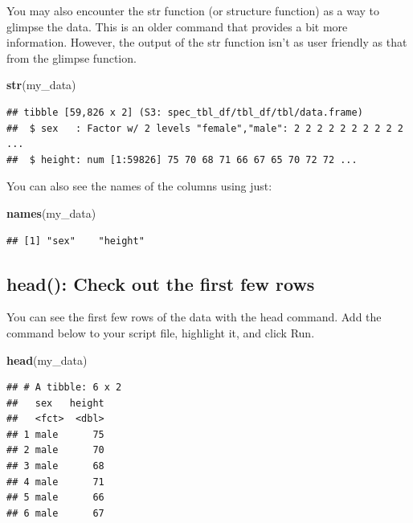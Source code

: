 \documentclass[
]{krantz}
\makeatletter
\newenvironment{Shaded}{\begin{snugshade}}{\end{snugshade}}
\newcommand{\KeywordTok}[1]{\textcolor[rgb]{0.27,0.27,0.27}{\textbf{#1}}}
\newcommand{\NormalTok}[1]{#1}
\newenvironment{kframe}{%
\medskip{}
\setlength{\fboxsep}{.8em}
 \def\at@end@of@kframe{}%
 \ifinner\ifhmode%
  \def\at@end@of@kframe{\end{minipage}}%
  \begin{minipage}{\columnwidth}%
 \fi\fi%
 \def\FrameCommand##1{\hskip\@totalleftmargin \hskip-\fboxsep
 \colorbox{shadecolor}{##1}\hskip-\fboxsep
     \hskip-\linewidth \hskip-\@totalleftmargin \hskip\columnwidth}%
 \MakeFramed {\advance\hsize-\width
   \@totalleftmargin\z@ \linewidth\hsize
   \@setminipage}}%
 {\par\unskip\endMakeFramed%
 \at@end@of@kframe}
\renewenvironment{Shaded}{\begin{kframe}}{\end{kframe}}
\makeatother
\begin{document}
You may also encounter the str function (or structure function) as a way to glimpse the data. This is an older command that provides a bit more information. However, the output of the str function isn't as user friendly as that from the glimpse function.

\begin{Shaded}
\begin{Highlighting}[]
\KeywordTok{str}\NormalTok{(my_data)}
\end{Highlighting}
\end{Shaded}

\begin{verbatim}
## tibble [59,826 x 2] (S3: spec_tbl_df/tbl_df/tbl/data.frame)
##  $ sex   : Factor w/ 2 levels "female","male": 2 2 2 2 2 2 2 2 2 2 ...
##  $ height: num [1:59826] 75 70 68 71 66 67 65 70 72 72 ...
\end{verbatim}

You can also see the names of the columns using just:

\begin{Shaded}
\begin{Highlighting}[]
\KeywordTok{names}\NormalTok{(my_data)}
\end{Highlighting}
\end{Shaded}

\begin{verbatim}
## [1] "sex"    "height"
\end{verbatim}

\hypertarget{head-check-out-the-first-few-rows}{%
\subsection{head(): Check out the first few rows}\label{head-check-out-the-first-few-rows}}

You can see the first few rows of the data with the head command. Add the command below to your script file, highlight it, and click Run.

\begin{Shaded}
\begin{Highlighting}[]
\KeywordTok{head}\NormalTok{(my_data)}
\end{Highlighting}
\end{Shaded}

\begin{verbatim}
## # A tibble: 6 x 2
##   sex   height
##   <fct>  <dbl>
## 1 male      75
## 2 male      70
## 3 male      68
## 4 male      71
## 5 male      66
## 6 male      67
\end{verbatim}
\end{document}
